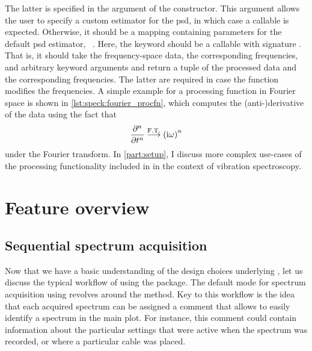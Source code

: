 The latter is specified in the  argument of the  constructor.
This argument allows the user to specify a custom estimator for the \gls{psd}, in which case a callable is expected.
Otherwise, it should be a mapping containing parameters for the default \gls{psd} estimator, ~.
Here, the keyword  should be a callable with signature .
That is, it should take the frequency-space data, the corresponding frequencies, and arbitrary keyword arguments and return a tuple of the processed data and the corresponding frequencies.
The latter are required in case the function modifies the frequencies.
A simple example for a processing function in Fourier space is shown in \cref{lst:speck:fourier_procfn}, which computes the \mbox{(anti-)}derivative of the data using the fact that
\begin{align}\label{eq:speck:fourier_derivative}
    \pdv[n]{t} \overset{\mathrm{F.T.}}{\longrightarrow} \left(\mathrm{i}\omega\right)^n
\end{align}
under the Fourier transform.
In \cref{part:setup}, I discuss more complex use-cases of the processing functionality included in \pyspeck in the context of vibration spectroscopy.

\section{Feature overview}\label{sec:speck:software:features}
\subsection{Sequential spectrum acquisition}\label{subsec:speck:software:features:sequential}
Now that we have a basic understanding of the design choices underlying \pyspeck, let us discuss the typical workflow of using the package.
The default mode for spectrum acquisition using \pyspeck revolves around the  method.
Key to this workflow is the idea that each acquired spectrum can be assigned a comment that allows to easily identify a spectrum in the main plot.
For instance, this comment could contain information about the particular settings that were active when the spectrum was recorded, or where a particular cable was placed.

